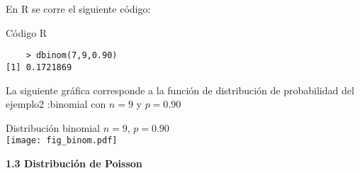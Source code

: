 \documentclass[base=hide,12pt]{elegantbook}
\begin{document}
En R se corre el siguiente código:\\

\begin{Box3}{Código R }
\begin{verbatim}
	> dbinom(7,9,0.90)
[1] 0.1721869
\end{verbatim}	
\end{Box3}

La siguiente gráfica corresponde a la función de distribución de probabilidad del ejemplo2 :binomial con $n=9$ y $p=0.90$\\ 
\begin{center}
	Distribución binomial $n=9$, $p=0.90$\\
	\texttt{[image: fig\_binom.pdf]}
\end{center}
\vspace{.5cm}


\vspace{1cm}
\textcolor{col4}{\LARGE  \bf 1.3 Distribución de Poisson }\\
\end{document}
